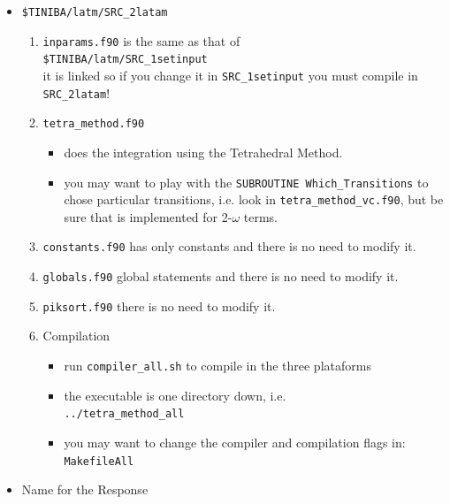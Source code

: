 \documentclass[12pt]{article}
\numberwithin{equation}{section}
\begin{document}
\begin{itemize}
\begin{enumerate}
\end{enumerate}

\item\verb=$TINIBA/latm/SRC_2latam=
\begin{enumerate}
\item\verb=inparams.f90= is the same as that of\\
\verb=$TINIBA/latm/SRC_1setinput=\\
it is linked so if you change it in \verb=SRC_1setinput=
 you must compile in \verb=SRC_2latam=!
\item \verb=tetra_method.f90=
\begin{itemize}
\item does the integration using the Tetrahedral Method.
\item you may want to play with the 
\verb=SUBROUTINE Which_Transitions= to chose particular transitions,
i.e. look in \verb=tetra_method_vc.f90=, but be sure that is
implemented for 2-$\omega$ terms.
\end{itemize}

\item \verb=constants.f90= has only constants and there is no need to
modify it.
\item \verb=globals.f90= global statements and there is no need to
modify it.
\item \verb=piksort.f90= there is no need to
modify it.
\item Compilation
\begin{itemize}
\item run \verb=compiler_all.sh= to compile in the three plataforms
\item the executable is one directory down, i.e.\\
\verb=../tetra_method_all=
\item you may want to change the compiler and compilation flags in:\\
\verb=MakefileAll=
\end{itemize}

\end{enumerate}

\item Name for the Response


\end{itemize}
\end{document}
